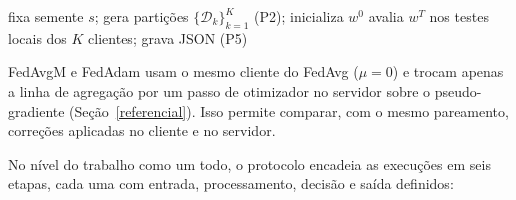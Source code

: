 \begin{algorithm}[ht]
    \small
    \caption{Uma execução do protocolo (FedProx; com $\mu = 0$, FedAvg).}
    \label{alg:fedprox}
    fixa semente $s$; gera partições $\{\mathcal{D}_k\}_{k=1}^{K}$ (P2); inicializa $w^0$\;
    avalia $w^T$ nos testes locais dos $K$ clientes; grava JSON (P5)\;
\end{algorithm}

FedAvgM e FedAdam usam o mesmo cliente do FedAvg ($\mu = 0$) e trocam apenas a linha de agregação por um passo de otimizador no servidor sobre o pseudo-gradiente (Seção~\ref{referencial}). Isso permite comparar, com o mesmo pareamento, correções aplicadas no cliente e no servidor.

No nível do trabalho como um todo, o protocolo encadeia as execuções em seis etapas, cada uma com entrada, processamento, decisão e saída definidos:


